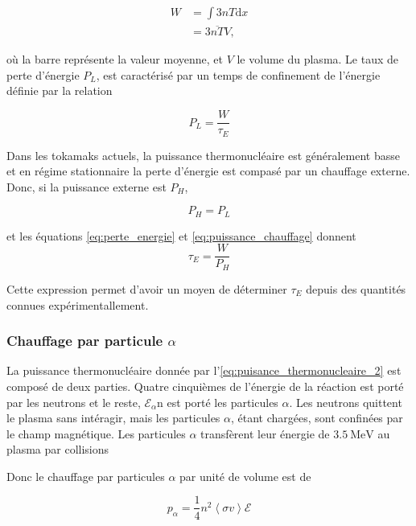 \documentclass[main.tex]{subfiles}
\begin{document}
\begin{align}
	W & = \int 3 n T \text{d} x \nonumber \\
	 & = 3 \overline{nT} V,
	 \label{eq:puissance_totale}
\end{align}

où la barre représente la valeur moyenne, et \( V \) le volume du plasma.
Le taux de perte d'énergie \( P_L \), est caractérisé par un temps de confinement de l'énergie définie par la relation

\begin{equation}
	P_L = \frac{W}{\tau_E}
	\label{eq:perte_energie}
\end{equation}

Dans les tokamaks actuels, la puissance thermonucléaire est généralement basse et en régime stationnaire la perte d'énergie est compasé par un chauffage externe. Donc, si la puissance externe est \( P_H \),

\begin{equation}
	P_H = P_L
	\label{eq:puissance_chauffage}
\end{equation}

et les équations \ref{eq:perte_energie} et \ref{eq:puissance_chauffage} donnent
\[
	\tau_E = \frac{W}{P_H}
\]

Cette expression permet d'avoir un moyen de déterminer \( \tau_E \) depuis des quantités connues expérimentallement.

\subsubsection*{Chauffage par particule \( \alpha \)}

La puissance thermonucléaire donnée par l'\autoref{eq:puisance_thermonucleaire_2} est composé de deux parties.
Quatre cinquièmes de l'énergie de la réaction est porté par les neutrons et le reste, \( \mathscr{E}_\alpha \)n est porté les particules \( \alpha \).
Les neutrons quittent le plasma sans intéragir, mais les particules \( \alpha \), étant chargées, sont confinées par le champ magnétique.
Les particules \( \alpha \) transfèrent leur énergie de \( \SI{3.5}{\mega\electronvolt} \) au plasma par collisions

Donc le chauffage par particules \( \alpha \) par unité de volume est de
 
\begin{equation}
	p_\alpha = \frac{1}{4} n^2 \left\langle \sigma v \right\rangle \mathscr{E}
	\label{eq:puissance_alpha}
\end{equation}
\end{document}
